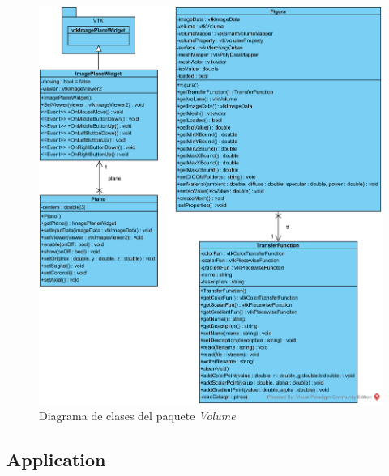 \begin{figure}[H]
	\centering
	\includegraphics[width=12.5cm]{imagenes/diagramas/clases/Volume}
	\caption{Diagrama de clases del paquete \textit{Volume}}
	\label{fig:diagrama_clases_volume}
\end{figure}

\subsection{Application}

